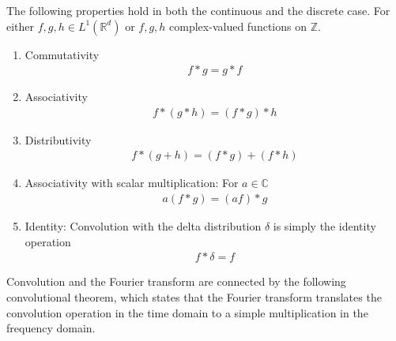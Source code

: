 \begin{proposition}
    The following properties hold in both the continuous and the discrete case. For either 
    $f, g, h \in L^1(\mathbb{R}^d)$ or $f, g, h$ complex-valued functions on $\mathbb{Z}$.  

    \begin{enumerate}
            \item Commutativity
                \begin{align*}
                    f \ast g = g \ast f
                \end{align*}
            \item Associativity
                \begin{align*}
                    f \ast (g \ast h) = (f \ast g) \ast h
                \end{align*}
            \item Distributivity
                \begin{align*}
                    f \ast (g + h) = (f \ast g) + (f \ast h)
                \end{align*}
            \item Associativity with scalar multiplication: For $a \in \mathbb{C}$
                \begin{align*}
                    a (f \ast g) = (a f) \ast g
                \end{align*}
            \item Identity: Convolution with the delta distribution $\delta$ is simply the identity operation
                \begin{align*}
                    f \ast \delta = f
                \end{align*}
    \end{enumerate}
    \label{prop:conv_properties}
\end{proposition}

Convolution and the Fourier transform are connected by the following convolutional theorem, which states that the Fourier transform translates 
the convolution operation in the time domain to a simple multiplication in the frequency domain.

